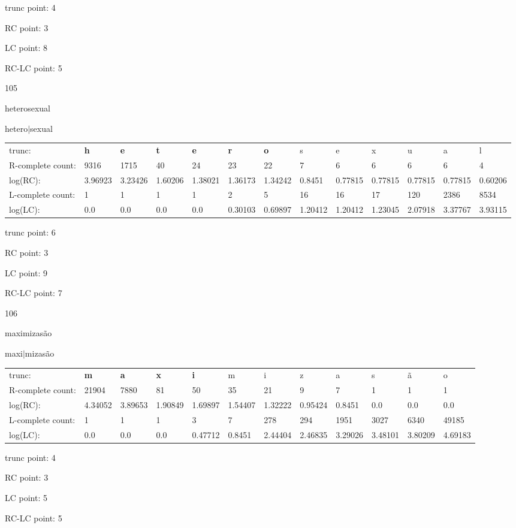 \documentclass{article}
\begin{document}
trunc point: 4

RC point: 3

LC point: 8

RC-LC point: 5

\vspace{3em}



105

heterosexual

hetero$|$sexual

\vspace{1em}

\begin{tabular}{l|llllllllllll}

trunc: & {\color{red}\bf h} & {\color{red}\bf e} & {\color{red}\bf t} & {\color{red}\bf e} & {\color{red}\bf r} & {\color{red}\bf o} & s & e & x & u & a & l \\ 
R-complete count: & 9316 & 1715 & 40 & 24 & 23 & 22 & 7 & 6 & 6 & 6 & 6 & 4 \\ 
log(RC): & 3.96923 & 3.23426 & 1.60206 & 1.38021 & 1.36173 & 1.34242 & 0.8451 & 0.77815 & 0.77815 & 0.77815 & 0.77815 & 0.60206 \\ 
L-complete count: & 1 & 1 & 1 & 1 & 2 & 5 & 16 & 16 & 17 & 120 & 2386 & 8534 \\ 
log(LC): & 0.0 & 0.0 & 0.0 & 0.0 & 0.30103 & 0.69897 & 1.20412 & 1.20412 & 1.23045 & 2.07918 & 3.37767 & 3.93115 \\ 
\end{tabular}

trunc point: 6

RC point: 3

LC point: 9

RC-LC point: 7

\vspace{3em}



106

maximizasão

maxi$|$mizasão

\vspace{1em}

\begin{tabular}{l|lllllllllll}

trunc: & {\color{red}\bf m} & {\color{red}\bf a} & {\color{red}\bf x} & {\color{red}\bf i} & m & i & z & a & s & ã & o \\ 
R-complete count: & 21904 & 7880 & 81 & 50 & 35 & 21 & 9 & 7 & 1 & 1 & 1 \\ 
log(RC): & 4.34052 & 3.89653 & 1.90849 & 1.69897 & 1.54407 & 1.32222 & 0.95424 & 0.8451 & 0.0 & 0.0 & 0.0 \\ 
L-complete count: & 1 & 1 & 1 & 3 & 7 & 278 & 294 & 1951 & 3027 & 6340 & 49185 \\ 
log(LC): & 0.0 & 0.0 & 0.0 & 0.47712 & 0.8451 & 2.44404 & 2.46835 & 3.29026 & 3.48101 & 3.80209 & 4.69183 \\ 
\end{tabular}

trunc point: 4

RC point: 3

LC point: 5

RC-LC point: 5

\vspace{3em}
\end{document}
